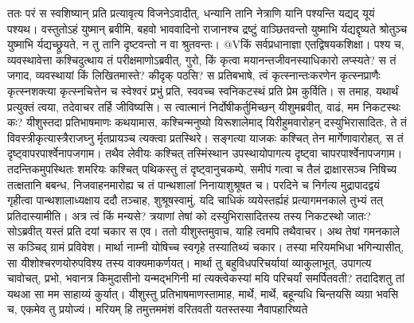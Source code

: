 \vakya ततः परं स स्वशिष्यान् प्रति प्रत्यावृत्य विजनेऽवादीत्, धन्यानि तानि नेत्राणि यानि पश्यन्ति यद्यद् यूयं पश्यथ।
\vakya वस्तुतोऽहं युष्मान् ब्रवीमि, बहवो भाववादिनो राजानश्च द्रष्टुं वाञ्छितवन्तो युष्माभि र्यद्यद्दृष्यते श्रोतुञ्च युष्माभि र्यद्यच्छ्रूयते, न तु तानि दृष्टवन्तो न वा श्रुतवन्तः।
@Vकिं सर्वप्रधानाज्ञा एतद्विषयकशिक्षा।
\vakya पश्य च, व्यवस्थावेत्ता कश्चिदुत्थाय तं परीक्षमाणोऽब्रवीत्, गुरो, किं कृत्वा मयानन्तजीवनस्याधिकारो लप्स्यते?
\vakya स तं जगाद, व्यवस्थायां किं लिखितमास्ते? कीदृक् पठसि?
\vakya स प्रतिबभाषे, त्वं कृत्स्नान्तःकरणेन कृत्स्नप्राणैः कृत्स्नशक्त्या कृत्स्नचित्तेन च स्वेश्वरं प्रभुं प्रति, स्ववच्च स्वनिकटस्थं प्रति प्रेम कुर्विति।
\vakya स तमाह, यथार्थं प्रत्युक्तं त्वया, तदेवाचर तर्हि जीविष्यसि।
\vakya स त्वात्मानं निर्दोषीकर्तुमिच्छन् यीशुमब्रवीत्, वाढं, मम निकटस्थः कः?
\vakya यीशुस्तदा प्रतिभाषमाणः कथयामास, कश्चिन्मनुष्यो यिरूशालेमाद् यिरीहुमवारोहन् दस्युभिरासादितः, ते तं विवस्त्रीकृत्यास्त्रैराजघ्नु र्मृतप्रायञ्च त्यक्त्वा प्रतस्थिरे।
\vakya सङ्गत्या याजकः कश्चित् तेन मार्गेणावारोहत्, स तं दृष्ट्वापरपार्श्वेनापजगाम।
\vakya तथैव लेवीयः कश्चित् तस्मिंस्थान उपस्थायोपागत्य दृष्ट्वा चापरपार्श्वेनापजगाम।
\vakya तदन्तिकमुपस्थितः शमरियः कश्चित् पथिकस्तु तं दृष्ट्वानुचकम्पे, समीपं गत्वा च तैलं द्राक्षारसञ्च निषिच्य तत्क्षतानि बबन्ध, निजवाहनमारोह्य च तं पान्थशालां निनायाशुश्रूषत च।
\vakya परदिने च निर्गत्य मुद्रापादद्वयं गृहीत्वा पान्थशालाध्यक्षाय ददौ तञ्चाह, शुश्रूषस्वामुं, यदि चाधिकं व्ययेस्तर्ह्यहं प्रत्यागमनकाले तुभ्यं तत् प्रतिदास्यामीति।
\vakya अत्र त्वं किं मन्यसे? त्रयाणां तेषां को दस्युभिरासादितस्य तस्य निकटस्थो जातः? सोऽब्रवीत् यस्तं प्रति दयां चकार स एव।
\vakya ततो यीशुस्तमुवाच, याहि त्वमपि तथैवाचर।
\vakya अथ तेषां गमनकाले स कञ्चिद् ग्रामं प्रविवेश। मार्था नाम्नी योषिच्च स्वगृहे तस्यातिथ्यं चकार।
\vakya तस्या मरियमभिधा भगिन्यासीत्, सा यीशोश्चरणयोरुपविश्य तस्य वाक्यमाकर्णयत्।
\vakya मार्था तु बहुविधपरिचर्यायां व्याकुलाभूत्, उपागत्य चावोचत्, प्रभो, भवानत्र किमुदासीनो यन्मद्भगिनी मां त्यक्त्वेकस्यां मयि परिचर्यां समर्पितवती? तदादिशतु तां यथआ सा मम साहाय्यं कुर्यात्।
\vakya यीशुस्तु प्रतिभाषमाणस्तामाह, मार्थे, मार्थे, बहून्यधि चिन्तयसि व्यग्रा भवसि च, एकमेव तु प्रयोज्यं।
\vakya मरियम् हि तमुत्तममंशं वरितवती यतस्तस्या नैवापहारिष्यते\eoc